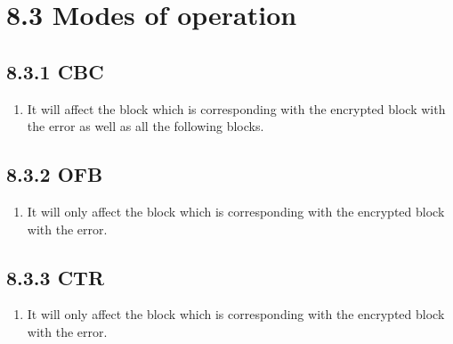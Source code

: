 \documentclass{report}
\begin{document}
	\section*{8.3 Modes of operation}
	\subsection*{8.3.1 CBC}
	\begin{enumerate}[]
		\item It will affect the block which is corresponding with the encrypted block with the error as well as all the following blocks.
	\end{enumerate}
	\subsection*{8.3.2 OFB}
	\begin{enumerate}[]
		\item It will only affect the block which is corresponding with the encrypted block with the error.
	\end{enumerate}
	\subsection*{8.3.3 CTR}
	\begin{enumerate}[]
		\item It will only affect the block which is corresponding with the encrypted block with the error.
	\end{enumerate}
	
\end{document}
